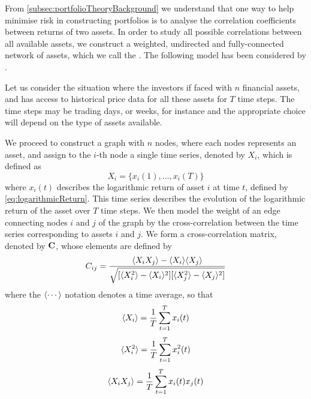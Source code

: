 From \cref{subsec:portfolioTheoryBackground} we understand that one way to help minimise risk in constructing portfolios is to analyse the correlation coefficients between returns of two assets.
In order to study all possible correlations between all available assets, we construct a weighted, undirected and fully-connected network of assets, which we call the . The following model has been considered by \cite{PGR+99,OCK+02,OKK03,FPM+10,MG13}.

Let us consider the situation where the investors if faced with $n$ financial assets, and has access to historical price data for all these assets for $T$ time steps. The time steps may be trading days, or weeks, for instance and the appropriate choice will depend on the type of assets available.

We proceed to construct a graph with $n$ nodes, where each nodes represents an asset, and assign to the $i$-th node a single time series, denoted by $X_{i}$, which is defined as
\begin{equation}
	\label{eq:singleTimeSeries}
	X_{i} = \{x_{i}(1),\dots,x_{i}(T)\}
\end{equation}
where $x_{i}(t)$ describes the logarithmic return of asset $i$ at time $t$, defined by \cref{eq:logarithmicReturn}.
This time series describes the evolution of the logarithmic return of the asset over $T$ time steps.
We then model the weight of an edge connecting nodes $i$ and $j$ of the graph by the cross-correlation between the time series corresponding to assets $i$ and $j$. We form a cross-correlation matrix, denoted by $\mathbf C$, whose elements are defined by
\begin{equation}
	\label{eq:crossCorrelationMatrix}
	C_{ij} = \frac{\langle X_{i} X_{j}\rangle - \langle X_{i}\rangle \langle X_{j}\rangle}{\sqrt{[\langle X_{i}^{2}\rangle - \langle X_{i}\rangle^{2}][\langle X_{j}^{2}\rangle - \langle X_{j}\rangle^{2}]}}
\end{equation}
where the $\langle\cdots\rangle$ notation denotes a time average, so that
\begin{equation}
	\label{eq:temporalMean}
	\langle X_{i}\rangle = \frac{1}{T} \sum_{t=1}^{T} x_{i}(t)
\end{equation}
\begin{equation}
	\label{eq:temporalMeanSquare}
	\langle X_{i}^{2}\rangle = \frac{1}{T} \sum_{t=1}^{T} x_{i}^{2}(t)
\end{equation}
\begin{equation}
	\label{eq:temporalMeanProduct}
	\langle X_{i}X_{j}\rangle = \frac{1}{T} \sum_{t=1}^{T} x_{i}(t)x_{j}(t)
\end{equation}
